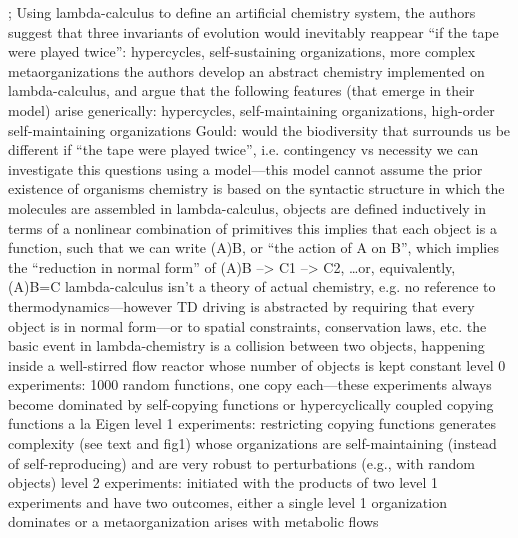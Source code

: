 \markdownRendererDocumentBegin
{}; Using lambda-calculus to define an artificial chemistry system, the authors suggest that three invariants of evolution would inevitably reappear “if the tape were played twice”: hypercycles, self-sustaining organizations, more complex metaorganizations\markdownRendererInterblockSeparator
{}\markdownRendererUlBegin
\markdownRendererUlItem the authors develop an abstract chemistry implemented on lambda-calculus, and argue that the following features (that emerge in their model) arise generically: hypercycles, self-maintaining organizations, high-order self-maintaining organizations\markdownRendererUlItemEnd 
\markdownRendererUlItem Gould: would the biodiversity that surrounds us be different if “the tape were played twice”, i.e. contingency vs necessity\markdownRendererUlItemEnd 
\markdownRendererUlItem we can investigate this questions using a model—this model cannot assume the prior existence of organisms\markdownRendererUlItemEnd 
\markdownRendererUlItem chemistry is based on the syntactic structure in which the molecules are assembled\markdownRendererUlItemEnd 
\markdownRendererUlItem in lambda-calculus, objects are defined inductively in terms of a nonlinear combination of primitives\markdownRendererUlItemEnd 
\markdownRendererUlItem this implies that each object is a function, such that we can write (A)B, or “the action of A on B”, which implies the “reduction in normal form” of (A)B --> C1 --> C2, …or, equivalently, (A)B=C\markdownRendererUlItemEnd 
\markdownRendererUlItem lambda-calculus isn’t a theory of actual chemistry, e.g. no reference to thermodynamics—however TD driving is abstracted by requiring that every object is in normal form—or to spatial constraints, conservation laws, etc.\markdownRendererUlItemEnd 
\markdownRendererUlItem the basic event in lambda-chemistry is a collision between two objects, happening inside a well-stirred flow reactor whose number of objects is kept constant\markdownRendererUlItemEnd 
\markdownRendererUlItem level 0 experiments: 1000 random functions, one copy each—these experiments always become dominated by self-copying functions or hypercyclically coupled copying functions a la Eigen\markdownRendererUlItemEnd 
\markdownRendererUlItem level 1 experiments: restricting copying functions generates complexity (see text and fig1) whose organizations are self-maintaining (instead of self-reproducing) and are very robust to perturbations (e.g., with random objects)\markdownRendererUlItemEnd 
\markdownRendererUlItem level 2 experiments: initiated with the products of two level 1 experiments and have two outcomes, either a single level 1 organization dominates or a metaorganization arises with metabolic flows\markdownRendererUlItemEnd 
